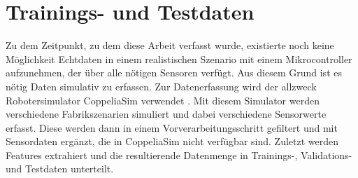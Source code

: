 \chapter{Trainings- und Testdaten}
Zu dem Zeitpunkt, zu dem diese Arbeit verfasst wurde, existierte noch keine Möglichkeit Echtdaten in einem
realistischen Szenario mit einem Mikrocontroller aufzunehmen, der über alle nötigen Sensoren verfügt.
Aus diesem Grund ist es nötig Daten simulativ zu erfassen.
\newline
\newline
Zur Datenerfassung wird der allzweck Robotersimulator CoppeliaSim verwendet \cite{coppeliaSim}.
Mit diesem Simulator werden verschiedene Fabrikszenarien simuliert und dabei verschiedene Sensorwerte erfasst.
Diese werden dann in einem Vorverarbeitungsschritt gefiltert und mit Sensordaten ergänzt, die in CoppeliaSim nicht verfügbar sind.
Zuletzt werden Features extrahiert und die resultierende Datenmenge in Trainings-, Validations- und Testdaten unterteilt.






